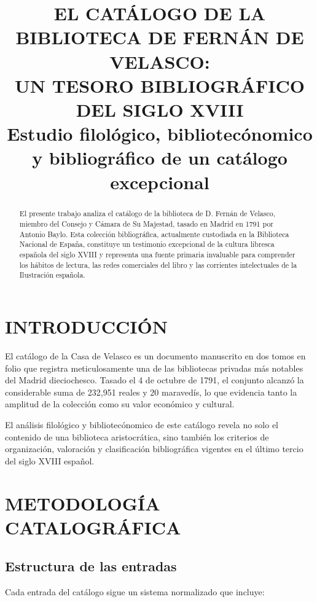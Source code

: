 \documentclass[12pt,a4paper]{article}
\title{\textbf{EL CATÁLOGO DE LA BIBLIOTECA DE FERNÁN DE VELASCO:} \\ 
\textbf{UN TESORO BIBLIOGRÁFICO DEL SIGLO XVIII} \\
\large Estudio filológico, bibliotecónomico y bibliográfico de un catálogo excepcional}
\author{}
\date{}
\begin{document}
\maketitle

\begin{abstract}
El presente trabajo analiza el catálogo de la biblioteca de D. Fernán de Velasco, miembro del Consejo y Cámara de Su Majestad, tasado en Madrid en 1791 por Antonio Baylo. Esta colección bibliográfica, actualmente custodiada en la Biblioteca Nacional de España, constituye un testimonio excepcional de la cultura libresca española del siglo XVIII y representa una fuente primaria invaluable para comprender los hábitos de lectura, las redes comerciales del libro y las corrientes intelectuales de la Ilustración española.
\end{abstract}

\section{INTRODUCCIÓN}

El catálogo de la Casa de Velasco es un documento manuscrito en dos tomos en folio que registra meticulosamente una de las bibliotecas privadas más notables del Madrid dieciochesco. Tasado el 4 de octubre de 1791, el conjunto alcanzó la considerable suma de 232,951 reales y 20 maravedís, lo que evidencia tanto la amplitud de la colección como su valor económico y cultural.

El análisis filológico y bibliotecónomico de este catálogo revela no solo el contenido de una biblioteca aristocrática, sino también los criterios de organización, valoración y clasificación bibliográfica vigentes en el último tercio del siglo XVIII español.

\section{METODOLOGÍA CATALOGRÁFICA}

\subsection{Estructura de las entradas}

Cada entrada del catálogo sigue un sistema normalizado que incluye:
\end{document}
